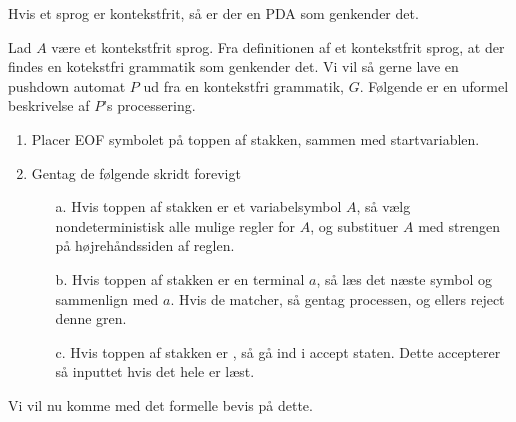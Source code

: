 \begin{lemma}
	Hvis et sprog er kontekstfrit, så er der en PDA som genkender det.
\end{lemma}

Lad $A$ være et kontekstfrit sprog. Fra definitionen af et kontekstfrit sprog, at der findes en kotekstfri grammatik som genkender det. Vi vil så gerne lave en pushdown automat $P$ ud fra en kontekstfri grammatik, $G$. Følgende er en uformel beskrivelse af $P$'s processering.
\begin{enumerate}
	\item Placer EOF symbolet \textdollar på toppen af stakken, sammen med startvariablen.
	\item Gentag de følgende skridt forevigt
	      \begin{enumerate}
		      \item[a.] Hvis toppen af stakken er et variabelsymbol $A$, så vælg nondeterministisk alle mulige regler for $A$, og substituer $A$ med strengen på højrehåndssiden af reglen.
		      \item[b.] Hvis toppen af stakken er en terminal $a$, så læs det næste symbol og sammenlign med $a$. Hvis de matcher, så gentag processen, og ellers reject denne gren.
		      \item[c.] Hvis toppen af stakken er \textdollar, så gå ind i accept staten. Dette accepterer så inputtet hvis det hele er læst.
	      \end{enumerate}
\end{enumerate}

Vi vil nu komme med det formelle bevis på dette.

